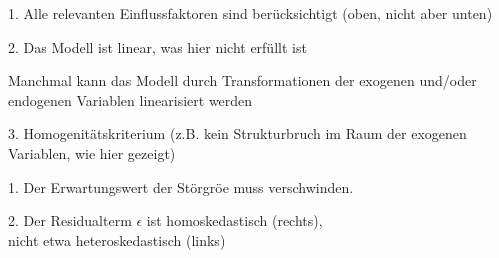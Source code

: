 \begin{landscape}
\begin{center}
\newpage
1. Alle relevanten Einflussfaktoren sind ber\"ucksichtigt (oben, nicht
aber unten)

\newpage
\vspace{2em}
\vspace{2em}
2. Das Modell ist  linear, was hier
nicht erf\"ullt ist

\newpage
\vspace{2em}
Manchmal kann das Modell durch Transformationen der exogenen und/oder
endogenen Variablen linearisiert werden



\newpage
\vspace{2em}
\vspace{2em}
3. Homogenit\"atskriterium (z.B. kein Strukturbruch im Raum der
exogenen Variablen, wie hier gezeigt)

\newpage
\vspace{2em}
\vspace{2em}
1. Der Erwartungswert der St\"orgr\"o\3e
muss verschwinden.


\newpage
\vspace{2em}
\vspace{2em}
2. Der Residualterm $\epsilon$ ist homoskedastisch (rechts),\\ nicht etwa
heteroskedastisch (links) 



\end{center}
\end{landscape}
